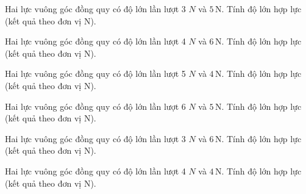 \begin{ex}
Hai lực vuông góc đồng quy có độ lớn lần lượt 3 $N$ và $5\,\text{N}$. Tính độ lớn hợp lực (kết quả theo đơn vị N).
\end{ex}

\begin{ex}
Hai lực vuông góc đồng quy có độ lớn lần lượt 4 $N$ và $6\,\text{N}$. Tính độ lớn hợp lực (kết quả theo đơn vị N).
\end{ex}

\begin{ex}
Hai lực vuông góc đồng quy có độ lớn lần lượt 5 $N$ và $4\,\text{N}$. Tính độ lớn hợp lực (kết quả theo đơn vị N).
\end{ex}

\begin{ex}
Hai lực vuông góc đồng quy có độ lớn lần lượt 6 $N$ và $5\,\text{N}$. Tính độ lớn hợp lực (kết quả theo đơn vị N).
\end{ex}

\begin{ex}
Hai lực vuông góc đồng quy có độ lớn lần lượt 3 $N$ và $6\,\text{N}$. Tính độ lớn hợp lực (kết quả theo đơn vị N).
\end{ex}

\begin{bt}
Hai lực vuông góc đồng quy có độ lớn lần lượt 4 $N$ và $4\,\text{N}$. Tính độ lớn hợp lực (kết quả theo đơn vị N).
\end{bt}

